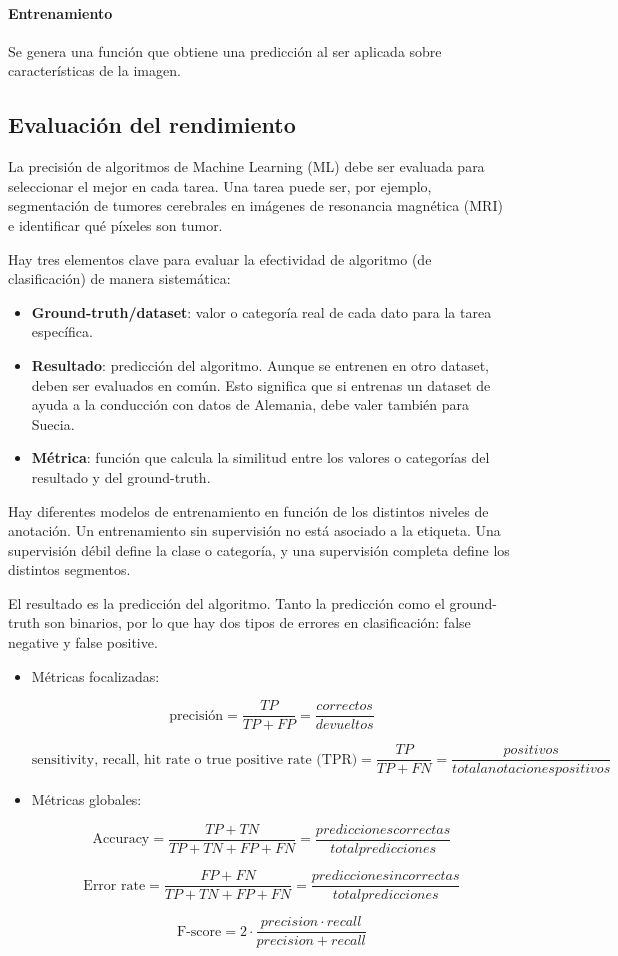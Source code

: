 \paragraph{Entrenamiento}
Se genera una función que obtiene una predicción al ser aplicada sobre características de la imagen.

\subsection{Evaluación del rendimiento}
La precisión de algoritmos de Machine Learning (ML) debe ser evaluada para seleccionar el mejor en cada tarea. 
Una tarea puede ser, por ejemplo, segmentación de tumores cerebrales en imágenes de resonancia magnética (MRI) e identificar qué píxeles son tumor.

Hay tres elementos clave para evaluar la efectividad de algoritmo (de clasificación) de manera sistemática:
\begin{itemize}
\item \textbf{Ground-truth/dataset}: valor o categoría real de cada dato para la tarea específica.
\item \textbf{Resultado}: predicción del algoritmo. Aunque se entrenen en otro dataset, deben ser evaluados en común. Esto significa que si entrenas un dataset de ayuda a la conducción con datos de Alemania, debe valer también para Suecia.
\item \textbf{Métrica}: función que calcula la similitud entre los valores o categorías del resultado y del ground-truth.
\end{itemize}

Hay diferentes modelos de entrenamiento en función de los distintos niveles de anotación. Un entrenamiento sin supervisión no está asociado a la etiqueta. Una supervisión débil define la clase o categoría, y una supervisión completa define los distintos segmentos. 

El resultado es la predicción del algoritmo. Tanto la predicción como el ground-truth son binarios, por lo que hay dos tipos de errores en clasificación: false negative y false positive. 
\begin{itemize}
\item Métricas focalizadas:

$$\text{precisión} = \frac{TP}{TP + FP} = \frac{correctos}{devueltos}$$

$$\text{sensitivity, recall, hit rate o true positive rate (TPR)} = \frac{TP}{TP + FN} = \frac{positivos}{total anotaciones positivos}$$

\item Métricas globales:

$$\text{Accuracy} = \frac{TP + TN}{TP + TN + FP + FN} = \frac{predicciones correctas}{total predicciones}$$

$$\text{Error rate} = \frac{FP + FN}{TP + TN + FP + FN} = \frac{predicciones incorrectas}{total predicciones}$$

$$\text{F-score} = 2 \cdot \frac{precision \cdot recall}{precision + recall}$$
\end{itemize}

